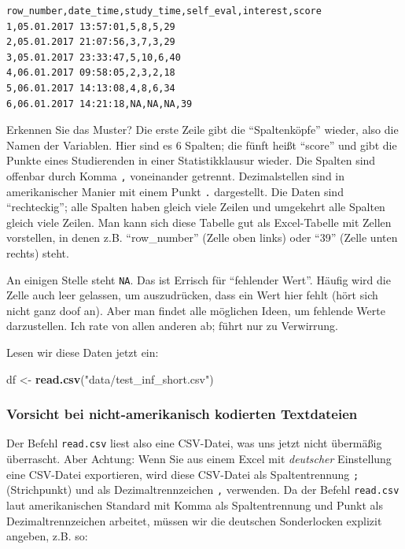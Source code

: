 \documentclass[12pt,ngerman,]{book}
\makeatletter
\newenvironment{Shaded}{\begin{snugshade}}{\end{snugshade}}
\newcommand{\KeywordTok}[1]{\textcolor[rgb]{0.13,0.29,0.53}{\textbf{{#1}}}}
\newcommand{\StringTok}[1]{\textcolor[rgb]{0.31,0.60,0.02}{{#1}}}
\newcommand{\NormalTok}[1]{{#1}}
\newenvironment{kframe}{%
\medskip{}
\setlength{\fboxsep}{.8em}
 \def\at@end@of@kframe{}%
 \ifinner\ifhmode%
  \def\at@end@of@kframe{\end{minipage}}%
  \begin{minipage}{\columnwidth}%
 \fi\fi%
 \def\FrameCommand##1{\hskip\@totalleftmargin \hskip-\fboxsep
 \colorbox{shadecolor}{##1}\hskip-\fboxsep
     \hskip-\linewidth \hskip-\@totalleftmargin \hskip\columnwidth}%
 \MakeFramed {\advance\hsize-\width
   \@totalleftmargin\z@ \linewidth\hsize
   \@setminipage}}%
 {\par\unskip\endMakeFramed%
 \at@end@of@kframe}
\renewenvironment{Shaded}{\begin{kframe}}{\end{kframe}}
\theoremstyle{definition}
\theoremstyle{definition}
\theoremstyle{remark}
\makeatother
\begin{document}
\begin{verbatim}
row_number,date_time,study_time,self_eval,interest,score
1,05.01.2017 13:57:01,5,8,5,29
2,05.01.2017 21:07:56,3,7,3,29
3,05.01.2017 23:33:47,5,10,6,40
4,06.01.2017 09:58:05,2,3,2,18
5,06.01.2017 14:13:08,4,8,6,34
6,06.01.2017 14:21:18,NA,NA,NA,39
\end{verbatim}

Erkennen Sie das Muster? Die erste Zeile gibt die ``Spaltenköpfe''
wieder, also die Namen der Variablen. Hier sind es 6 Spalten; die fünft
heißt ``score'' und gibt die Punkte eines Studierenden in einer
Statistikklausur wieder. Die Spalten sind offenbar durch Komma
\texttt{,} voneinander getrennt. Dezimalstellen sind in amerikanischer
Manier mit einem Punkt \texttt{.} dargestellt. Die Daten sind
``rechteckig''; alle Spalten haben gleich viele Zeilen und umgekehrt
alle Spalten gleich viele Zeilen. Man kann sich diese Tabelle gut als
Excel-Tabelle mit Zellen vorstellen, in denen z.B. ``row\_number''
(Zelle oben links) oder ``39'' (Zelle unten rechts) steht.

An einigen Stelle steht \texttt{NA}. Das ist Errisch für ``fehlender
Wert''. Häufig wird die Zelle auch leer gelassen, um auszudrücken, dass
ein Wert hier fehlt (hört sich nicht ganz doof an). Aber man findet alle
möglichen Ideen, um fehlende Werte darzustellen. Ich rate von allen
anderen ab; führt nur zu Verwirrung.

Lesen wir diese Daten jetzt ein:

\begin{Shaded}
\begin{Highlighting}[]
\NormalTok{df <-}\StringTok{ }\KeywordTok{read.csv}\NormalTok{(}\StringTok{"data/test_inf_short.csv"}\NormalTok{)}
\end{Highlighting}
\end{Shaded}

\subsubsection{Vorsicht bei nicht-amerikanisch kodierten
Textdateien}\label{vorsicht-bei-nicht-amerikanisch-kodierten-textdateien}

Der Befehl \texttt{read.csv} liest also eine CSV-Datei, was uns jetzt
nicht übermäßig überrascht. Aber Achtung: Wenn Sie aus einem Excel mit
\emph{deutscher} Einstellung eine CSV-Datei exportieren, wird diese
CSV-Datei als Spaltentrennung \texttt{;} (Strichpunkt) und als
Dezimaltrennzeichen \texttt{,} verwenden. Da der Befehl
\texttt{read.csv} laut amerikanischen Standard mit Komma als
Spaltentrennung und Punkt als Dezimaltrennzeichen arbeitet, müssen wir
die deutschen Sonderlocken explizit angeben, z.B. so:
\end{document}
